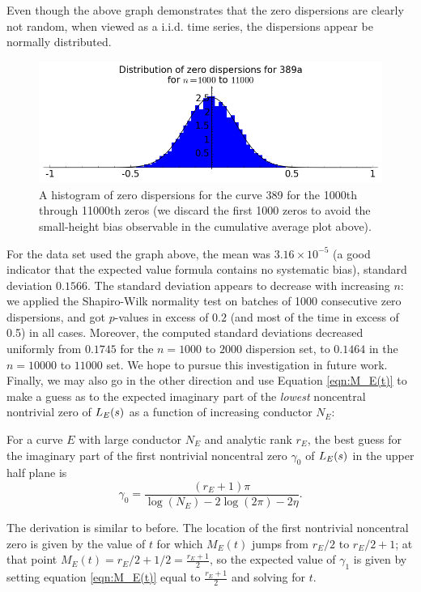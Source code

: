 Even though the above graph demonstrates that the zero dispersions are clearly not random, when viewed as a i.i.d. time series, the dispersions appear be normally distributed. \\

\begin{figure}[!h]
    \centering
    \includegraphics[width=1.0\textwidth]{graphics/389a_zero_dispersions_histagram.png}
    \caption{A histogram of zero dispersions for the curve 389 for the 1000th through 11000th zeros (we discard the first 1000 zeros to avoid the small-height bias observable in the cumulative average plot above). }
    \label{fig:389a_zero_dispersions_histagram}
\end{figure}

For the data set used the graph above, the mean was $3.16\times10^{-5}$ (a good indicator that the expected value formula contains no systematic bias), standard deviation $0.1566$. The standard deviation appears to decrease with increasing $n$: we applied the Shapiro-Wilk normality test on batches of 1000 consecutive zero dispersions, and got $p$-values in excess of $0.2$ (and most of the time in excess of 0.5) in all cases. Moreover, the computed standard deviations decreased uniformly from $0.1745$ for the $n=1000$ to $2000$ dispersion set, to $0.1464$ in the $n=10000$ to $11000$ set. We hope to pursue this investigation in future work. \\

Finally, we may also go in the other direction and use Equation \ref{eqn:M_E(t)} to make a guess as to the expected imaginary part of the {\it lowest} noncentral nontrivial zero of $L_E(s)$ as a function of increasing conductor $N_E$:
\begin{proposition}[GRH]
For a curve $E$ with large conductor $N_E$ and analytic rank $r_E$, the best guess for the imaginary part of the first nontrivial noncentral zero $\gamma_0$ of $L_E(s)$ in the upper half plane is
\begin{equation}
\gamma_0 = \frac{(r_E+1)\pi}{\log(N_E) -2\log(2\pi) -2\eta}.
\end{equation}
\end{proposition}
The derivation is similar to before. The location of the first nontrivial noncentral zero is given by the value of $t$ for which $M_E(t)$ jumps from $r_E/2$ to $r_E/2+1$; at that point $M_E(t) = r_E/2 + 1/2 = \frac{r_E+1}{2}$, so the expected value of $\gamma_1$ is given by setting equation \ref{eqn:M_E(t)} equal to $\frac{r_E+1}{2}$ and solving for $t$. \\

